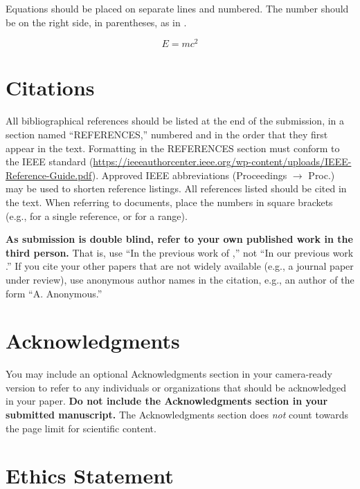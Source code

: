 \documentclass{article}
\begin{document}
Equations should be placed on separate lines and numbered. The number should be on the right side, in parentheses, as in .

\begin{equation}\label{relativity}
E=mc^{2}
\end{equation}

\section{Citations}

All bibliographical references should be listed at the end of the submission, in a section named ``REFERENCES,'' numbered and in the order that they first appear in the text. Formatting in the REFERENCES section must conform to the IEEE standard (\url{https://ieeeauthorcenter.ieee.org/wp-content/uploads/IEEE-Reference-Guide.pdf}). Approved IEEE abbreviations (Proceedings $\rightarrow$ Proc.) may be used to shorten reference listings. All references listed should be cited in the text. When referring to documents, place the numbers in square brackets (e.g., \cite{ISMIR17Author:01} for a single reference, or \cite{JNMR10Someone:01,Book20Person:01,Chapter09Person:01} for a range).

\textbf{As submission is double blind, refer to your own published work in the third person.} That is, use ``In the previous work of \cite{ISMIR17Author:01},'' not ``In our previous work \cite{ISMIR17Author:01}.'' If you cite your other papers that are not widely available (e.g., a journal paper under review), use anonymous author names in the citation, e.g., an author of the form ``A. Anonymous.''

\section{Acknowledgments}

You may include an optional Acknowledgments section in your camera-ready version to refer to any individuals or organizations that should be acknowledged in your paper. \textbf{Do not include the Acknowledgments section in your submitted manuscript.} The Acknowledgments section does \textit{not} count towards the page limit for scientific content.

\section{Ethics Statement}
\end{document}
